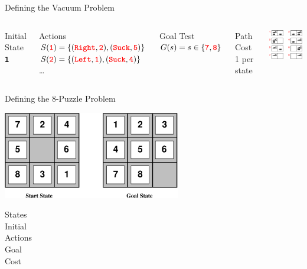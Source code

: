 \documentclass[14pt]{beamer}
\newcommand{\key}[1]{\mbox{\texttt{\bfseries\color{red}#1}}}
\begin{document}
\begin{frame}{Defining the Vacuum Problem}
	\begin{columns}
			\begin{block}{Initial State}
				\key{1}
			\end{block}
			\begin{block}{Actions}
				\small
	      $S(\key{1}) = \{(\key{Right}, \key{2}), (\key{Suck}, \key{5})\}$ \\
	      $S(\key{2}) = \{(\key{Left}, \key{1}), (\key{Suck}, \key{4})\}$ \\
	      \ldots
			\end{block}
			\begin{block}{Goal Test}
				$G(s) = s \in \{\key{7}, \key{8}\}$
			\end{block}
			\begin{block}{Path Cost}
				1 per state
			\end{block}
			\includegraphics[width=2.1in]{vacuum-space.pdf}
	\end{columns}
\end{frame}

\begin{frame}{Defining the 8-Puzzle Problem}
	\begin{center}
		\includegraphics[height=1.5in]{8puzzle.pdf}
	\end{center}
	\begin{description}
		\item[States] 
		\item[Initial] 
		\item[Actions] 
		\item[Goal] 
		\item[Cost] 
	\end{description}
\end{frame}
\end{document}
